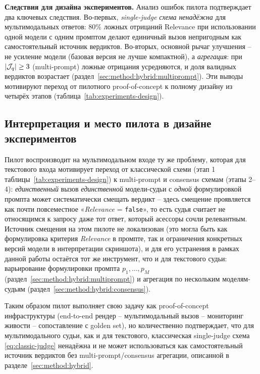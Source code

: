 \textbf{Следствия для дизайна экспериментов.}
Анализ ошибок пилота подтверждает два ключевых следствия.
Во-первых, \emph{single-judge схема ненадёжна} для
мультимодальных ответов: $80\%$ ложных отрицаний Relevance
при использовании одной модели с одним промптом делают
единичный вызов непригодным как самостоятельный источник
вердиктов.
Во-вторых, основной рычаг улучшения -- не усиление модели
(базовая версия не лучше компактной), а \emph{агрегация}: при
$|\mathcal{J}_q| \ge 3$ (multi-prompt) ложные отрицания
усредняются, и доля валидных вердиктов возрастает
(раздел~\ref{sec:method:hybrid:multiprompt}).
Эти выводы мотивируют переход от пилотного proof-of-concept к
полному дизайну из четырёх этапов
(таблица~\ref{tab:experiments-design}).

\subsection{Интерпретация и место пилота в дизайне экспериментов}

Пилот воспроизводит на мультимодальном входе ту же проблему, которая для
текстового входа мотивирует переход от классической схеми (этап 1
таблицы~\ref{tab:experiments-design}) к multi-prompt и consensus схемам
(этапы 2--4): \emph{единственный} вызов \emph{единственной} модели-судьи с
\emph{одной} формулировкой промпта может систематически смещать
вердикт -- здесь смещение проявляется как почти повсеместное
«\emph{Relevance} = \texttt{false}», то есть судья считает не относящимся
к запросу даже тот ответ, который асессоры сочли релевантным.
Источник смещения на этом пилоте не локализован (это могла быть как
формулировка критерия \emph{Relevance} в промпте, так и ограничения
конкретных версий модели в интерпретации скриншота), и для его устранения
в рамках данной работы остаётся тот же инструмент, что и для текстового
судьи: варьирование формулировки промпта $p_1, \dots, p_M$
(раздел~\ref{sec:method:hybrid:multiprompt}) и агрегация по нескольким
моделям-судьям (раздел~\ref{sec:method:hybrid:consensus}).

Таким образом пилот выполняет свою задачу как proof-of-concept
инфраструктуры (end-to-end рендер -- мультимодальный вызов -- мониторинг
живости -- сопоставление с golden set), но количественно подтверждает, что
для мультимодального судьи, как и для текстового, классическая
single-judge схема \eqref{eq:classic-judge} ненадёжна и не может
использоваться как самостоятельный источник вердиктов без
multi-prompt/consensus агрегации, описанной в
разделе~\ref{sec:method:hybrid}.

